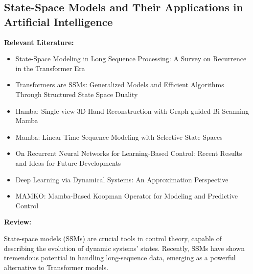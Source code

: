 \documentclass{article}
\theoremstyle{plain}
\theoremstyle{definition}
\theoremstyle{remark}
\begin{document}
\subsection{State-Space Models and Their Applications in Artificial Intelligence}
\textbf{Relevant Literature:}
\begin{itemize}
    \item State-Space Modeling in Long Sequence Processing: A Survey on Recurrence in the Transformer Era
    \item Transformers are SSMs: Generalized Models and Efficient Algorithms Through Structured State Space Duality
    \item Hamba: Single-view 3D Hand Reconstruction with Graph-guided Bi-Scanning Mamba
    \item Mamba: Linear-Time Sequence Modeling with Selective State Spaces
    \item On Recurrent Neural Networks for Learning-Based Control: Recent Results and Ideas for Future Developments
    \item Deep Learning via Dynamical Systems: An Approximation Perspective
    \item MAMKO: Mamba-Based Koopman Operator for Modeling and Predictive Control
\end{itemize}

\textbf{Review:}

State-space models (SSMs) are crucial tools in control theory, capable of describing the evolution of dynamic systems' states. Recently, SSMs have shown tremendous potential in handling long-sequence data, emerging as a powerful alternative to Transformer models.
\end{document}
